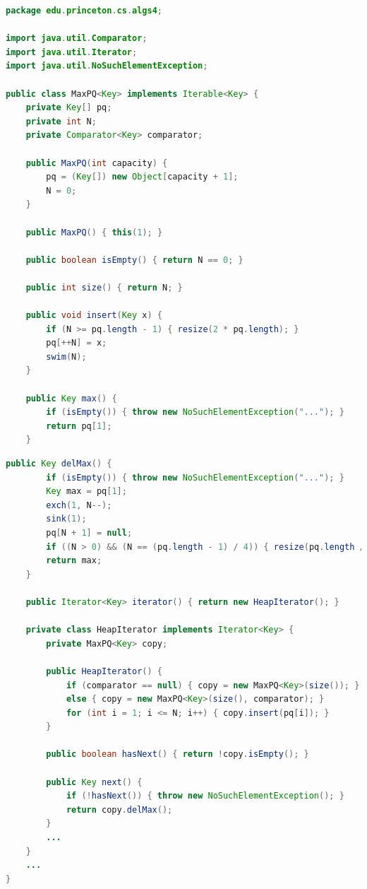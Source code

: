 \documentclass[8pt,a4paper,compress]{beamer}
\begin{document}
\begin{frame}[fragile]
\begin{lstlisting}[language=Java]
package edu.princeton.cs.algs4;

import java.util.Comparator;
import java.util.Iterator;
import java.util.NoSuchElementException;

public class MaxPQ<Key> implements Iterable<Key> {
    private Key[] pq;
    private int N;
    private Comparator<Key> comparator; 
    
    public MaxPQ(int capacity) {
        pq = (Key[]) new Object[capacity + 1];
        N = 0;
    }

    public MaxPQ() { this(1); }
    
    public boolean isEmpty() { return N == 0; }

    public int size() { return N; }

    public void insert(Key x) {
        if (N >= pq.length - 1) { resize(2 * pq.length); }
        pq[++N] = x;
        swim(N);
    }

    public Key max() {
        if (isEmpty()) { throw new NoSuchElementException("..."); }
        return pq[1];
    }
\end{lstlisting}
\end{frame}

\begin{frame}[fragile]
\begin{lstlisting}[language=Java]    
    public Key delMax() {
        if (isEmpty()) { throw new NoSuchElementException("..."); }
        Key max = pq[1];
        exch(1, N--);
        sink(1);
        pq[N + 1] = null; 
        if ((N > 0) && (N == (pq.length - 1) / 4)) { resize(pq.length / 2); }
        return max;
    }
    
    public Iterator<Key> iterator() { return new HeapIterator(); }
    
    private class HeapIterator implements Iterator<Key> {
        private MaxPQ<Key> copy;

        public HeapIterator() {
            if (comparator == null) { copy = new MaxPQ<Key>(size()); }
            else { copy = new MaxPQ<Key>(size(), comparator); }
            for (int i = 1; i <= N; i++) { copy.insert(pq[i]); }
        }

        public boolean hasNext() { return !copy.isEmpty(); }

        public Key next() {
            if (!hasNext()) { throw new NoSuchElementException(); }
            return copy.delMax();
        }
        ...
    }
    ...
}
\end{lstlisting}
\end{frame}
\end{document}
